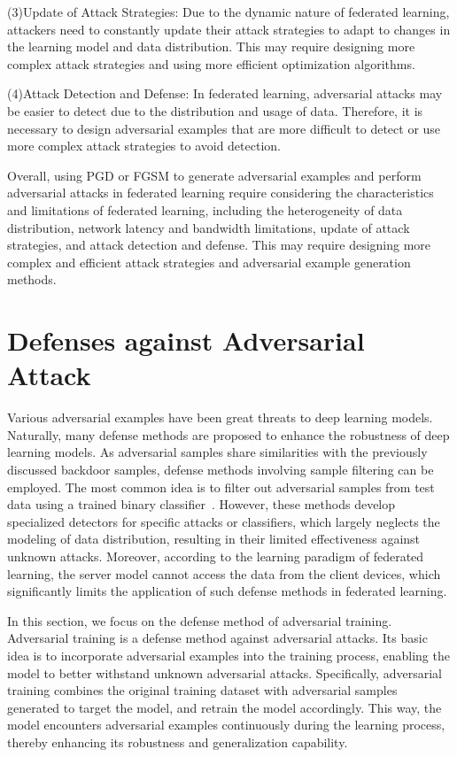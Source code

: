 \documentclass[pdflatex,sn-mathphys-num]{sn-jnl}%
\theoremstyle{thmstyleone}%
\theoremstyle{thmstyletwo}%
\theoremstyle{thmstylethree}%
\begin{document}
(3)Update of Attack Strategies: Due to the dynamic
nature of federated learning, attackers need to constantly
update their attack strategies to adapt to changes in the
learning model and data distribution. This may require
designing more complex attack strategies and using more
eﬀicient optimization algorithms.

(4)Attack Detection and Defense: In federated learning,
adversarial attacks may be easier to detect due to the
distribution and usage of data. Therefore, it is necessary
to design adversarial examples that are more diﬀicult to
detect or use more complex attack strategies to avoid
detection.

Overall, using PGD or FGSM to generate adversarial
examples and perform adversarial attacks in federated
learning require considering the characteristics and limitations of federated learning, including the heterogeneity
of data distribution, network latency and bandwidth limitations,
update of attack strategies, and attack detection
and defense. This may require designing more complex
and eﬀicient attack strategies and adversarial example
generation methods.

\section{Defenses against Adversarial Attack}
\label{Defenses against Adversarial Attack}
Various adversarial examples have been great threats to
deep learning models. Naturally, many defense methods
are proposed to enhance the robustness of deep learning
models. As adversarial samples share similarities with the
previously discussed backdoor samples, defense methods
involving sample filtering can be employed.
The most common idea is to filter out adversarial samples from test data using a trained binary classifier~\cite{wang2024defense, wang2024detecting,zhang2023detecting}.
However, these methods develop specialized detectors for specific attacks or classifiers, 
which largely neglects the modeling of data distribution, resulting in their limited effectiveness against unknown attacks.
Moreover, according to the learning paradigm of federated learning, the server model cannot access the data from the client devices, which significantly limits the application of such defense methods in federated learning.

In this section, we focus on the defense method of adversarial
training. Adversarial training is a defense method against
adversarial attacks. Its basic idea is to incorporate
adversarial examples into the training process, enabling the
model to better withstand unknown adversarial attacks.
Specifically, adversarial training combines the original
training dataset with adversarial samples generated to
target the model, and retrain the model accordingly. This
way, the model encounters adversarial examples
continuously during the learning process, thereby enhancing
its robustness and generalization capability.
\end{document}
